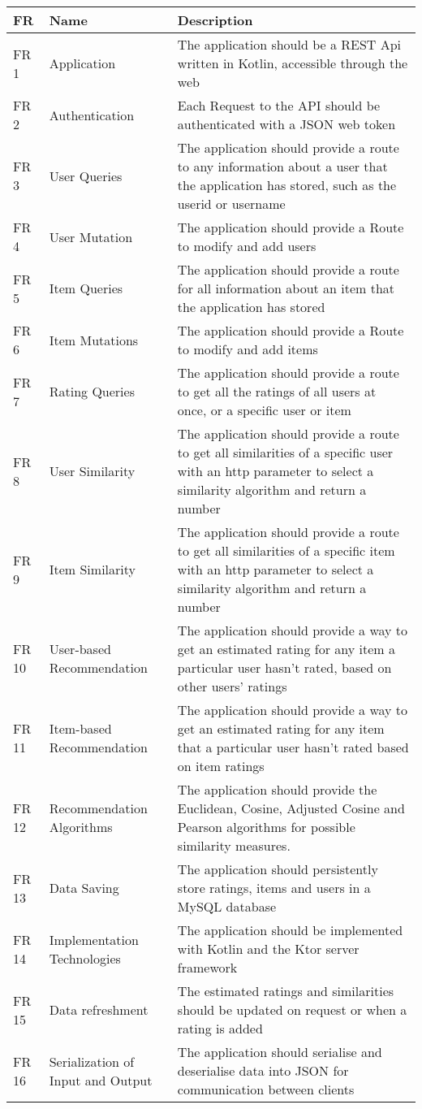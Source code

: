 \begin{longtable}{|p{1.2cm}||p{3.2cm}|p{9cm}|}
    \hline
	  FR & Name & Description \\
	\hline
	FR 1 & Application    & The application should be a REST Api written in Kotlin, accessible through the web \\
    \hline
	FR 2 & Authentication & Each Request to the API should be authenticated with a JSON web token \\
	\hline
    FR 3 & User Queries & The application should provide a route to any information about a user that the application has stored, such as the userid or username \\
	\hline
    FR 4 & User Mutation & The application should provide a Route to modify and add users \\
	\hline
    FR 5 & Item Queries & The application should provide a route for all information about an item that the application has stored\\
	\hline
    FR 6 & Item Mutations & The application should provide a Route to modify and add items \\
	\hline
    FR 7 & Rating Queries & The application should provide a route to get all the ratings of all users at once, or a specific user or item\\
	\hline
    FR 8 & User Similarity & The application should provide a route to get all similarities of a specific user with an http parameter to select a similarity algorithm and return a number \\
	\hline
    FR 9 & Item Similarity & The application should provide a route to get all similarities of a specific item with an http parameter to select a similarity algorithm and return a number  \\
	\hline
    FR 10 & User-based Recommendation & The application should provide a way to get an estimated rating for any item a particular user hasn't rated, based on other users' ratings \\
	\hline
    FR 11 & Item-based Recommendation & The application should provide a way to get an estimated rating for any item that a particular user hasn't rated based on item ratings \\
	\hline
    FR 12 & Recommendation Algorithms & The application should provide the Euclidean, Cosine, Adjusted Cosine and Pearson algorithms for possible similarity measures. \\
	\hline
    FR 13 & Data Saving & The application should persistently store ratings, items and users in a MySQL database \\
	\hline
    FR 14 & Implementation Technologies & The application should be implemented with Kotlin and the Ktor server framework \\
	\hline
    FR 15 & Data refreshment & The estimated ratings and similarities should be updated on request or when a rating is added \\
	\hline
    FR 16 & Serialization of Input and Output & The application should serialise and deserialise data into JSON for communication between clients\\
	\hline


\end{longtable}
